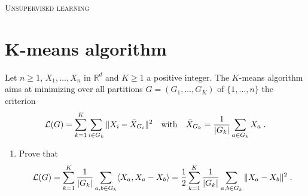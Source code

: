 \documentclass[a4paper,10pt,fleqn]{article}
\newcommand{\R}{\ensuremath{\mathbb{R}}}
\newcommand{\1}{\ensuremath{\mathbbm{1}}}
\newcommand{\crit}{\mathcal{L}}
\begin{document}
\noindent\hrulefill

\begin{center}
\textsc{Unsupervised learning}
\end{center}
\hrulefill

\medskip


\section{K-means algorithm}
Let $n\geqslant 1$, $X_{1},\ldots,X_{n}$ in $\R^d$ and $K \geqslant 1$ a positive integer.
The $K$-means algorithm aims at minimizing over all partitions $G=(G_{1},\ldots,G_{K})$ of $\{1,\ldots,n\}$ the criterion
$$
\crit(G)=\sum_{k=1}^K\sum_{i\in G_{k}}\|X_{i}-\bar{X}_{G_{i}}\|^2\quad \textrm{with}\quad \bar{X}_{G_{k}}={1\over |G_{k}|}\sum_{a\in G_{k}} X_{a}\;.
$$
\begin{enumerate}
\item Prove that
$$
\crit(G)=\sum_{k=1}^K{1\over |G_{k}|}\sum_{a,b\in G_{k}} \langle X_{a},X_{a}-X_{b}\rangle ={1\over 2}\sum_{k=1}^K{1\over |G_{k}|}\sum_{a,b\in G_{k}} \|X_{a}-X_{b}\|^2\;.
$$

\vspace{.2cm}


\end{enumerate}
\end{document}
